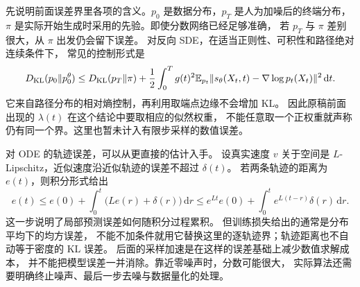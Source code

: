 先说明前面误差界里各项的含义。$p_0$ 是数据分布，$p_T$ 是人为加噪后的终端分布，
$\pi$ 是实际开始生成时采用的先验。即使分数网络已经足够准确，
若 $p_T$ 与 $\pi$ 差别很大，从 $\pi$ 出发仍会留下误差。
对反向 SDE，在适当正则性、可积性和路径绝对连续条件下，
常见的控制形式是
\[
D_{\rm KL}(p_0\|p_0^\theta)
\leq D_{\rm KL}(p_T\|\pi)
 +\frac12\int_0^Tg(t)^2\mathbb E_{p_t}
 \|s_\theta(X_t,t)-\nabla\log p_t(X_t)\|^2\,\mathrm dt.
\]
它来自路径分布的相对熵控制，再利用取端点边缘不会增加 KL。
因此原稿前面出现的 $\lambda(t)$ 在这个结论中要取相应的似然权重，
不能任意取一个正权重就声称仍有同一个界。这里也暂未计入有限步采样的数值误差。
\cite{sde,theorybook}

对 ODE 的轨迹误差，可以从更直接的估计入手。
设真实速度 $v$ 关于空间是 $L$-Lipschitz，近似速度沿近似轨迹的误差不超过 $\delta(t)$。
若两条轨迹的距离为 $e(t)$，则积分形式给出
\[
e(t)\leq e(0)+\int_0^t\bigl(Le(r)+\delta(r)\bigr)\,\mathrm dr
\leq e^{Lt}e(0)+\int_0^te^{L(t-r)}\delta(r)\,\mathrm dr.
\]
这一步说明了局部预测误差如何随积分过程累积。
但训练损失给出的通常是分布平均下的均方误差，
不能不加条件就用它替换这里的逐轨迹界；轨迹距离也不自动等于密度的 KL 误差。
后面的采样加速是在这样的误差基础上减少数值求解成本，
并不能把模型误差一并消除。靠近零噪声时，分数可能很大，
实际算法还需要明确终止噪声、最后一步去噪与数据量化的处理。
